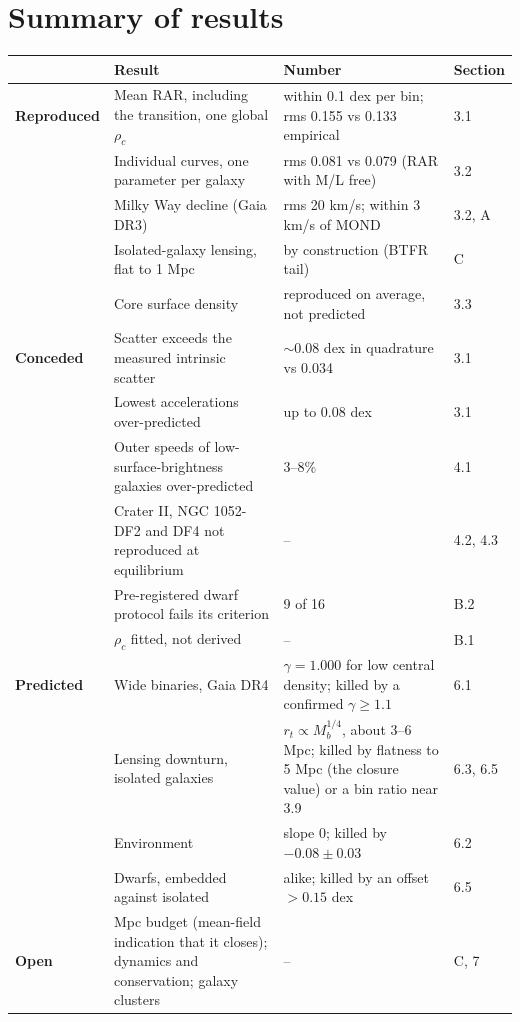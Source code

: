 \documentclass[
  10pt,
]{article}
\begin{document}
\begin{abstract}
It falls short in four ways, each of which weakens it:
\begin{itemize}
\item with a single central density its scatter about the RAR is larger than observed, by well over the relation's measured intrinsic scatter;
\item it over-predicts the lowest accelerations, by up to 0.08 dex, and the outer speeds of low-surface-brightness galaxies, by a few per cent;
\item the central density is fitted, not derived; and
\item a first pre-registered test on dwarf dispersions misses its target.
\end{itemize}
We set out the tests that can decide.
\end{abstract}

\clearpage
\section{Summary of results}\label{summary}

{\small
\begin{longtable}[]{@{}p{2.0cm}p{6.0cm}p{5.5cm}p{1.5cm}@{}}
\toprule
 & Result & Number & Section\tabularnewline
\midrule
\endhead
\textbf{Reproduced} & Mean RAR, including the transition, one global $\rho_c$ & within 0.1 dex per bin; rms 0.155 vs 0.133 empirical & 3.1\tabularnewline
 & Individual curves, one parameter per galaxy & rms 0.081 vs 0.079 (RAR with M/L free) & 3.2\tabularnewline
 & Milky Way decline (Gaia DR3) & rms 20 km/s; within 3 km/s of MOND & 3.2, A\tabularnewline
 & Isolated-galaxy lensing, flat to 1 Mpc & by construction (BTFR tail) & C\tabularnewline
 & Core surface density & reproduced on average, not predicted & 3.3\tabularnewline
\midrule
\textbf{Conceded} & Scatter exceeds the measured intrinsic scatter & $\sim$0.08 dex in quadrature vs 0.034 & 3.1\tabularnewline
 & Lowest accelerations over-predicted & up to 0.08 dex & 3.1\tabularnewline
 & Outer speeds of low-surface-brightness galaxies over-predicted & 3--8\% & 4.1\tabularnewline
 & Crater II, NGC 1052-DF2 and DF4 not reproduced at equilibrium & -- & 4.2, 4.3\tabularnewline
 & Pre-registered dwarf protocol fails its criterion & 9 of 16 & B.2\tabularnewline
 & $\rho_c$ fitted, not derived & -- & B.1\tabularnewline
\midrule
\textbf{Predicted} & Wide binaries, Gaia DR4 & $\gamma=1.000$ for low central density; killed by a confirmed $\gamma\ge1.1$ & 6.1\tabularnewline
 & Lensing downturn, isolated galaxies & $r_t\propto M_b^{1/4}$, about 3--6 Mpc; killed by flatness to 5 Mpc (the closure value) or a bin ratio near 3.9 & 6.3, 6.5\tabularnewline
 & Environment & slope 0; killed by $-0.08\pm0.03$ & 6.2\tabularnewline
 & Dwarfs, embedded against isolated & alike; killed by an offset $>0.15$ dex & 6.5\tabularnewline
\midrule
\textbf{Open} & Mpc budget (mean-field indication that it closes); dynamics and conservation; galaxy clusters & -- & C, 7\tabularnewline
\bottomrule
\end{longtable}}
\end{document}
